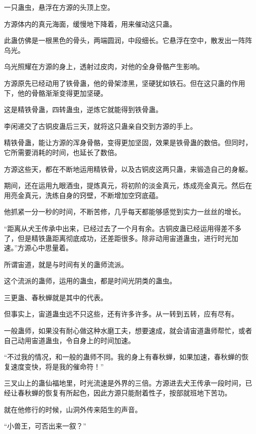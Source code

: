
\begin{this_body}

一只蛊虫，悬浮在方源的头顶上空。

方源体内的真元海面，缓慢地下降着，用来催动这只蛊。

此蛊仿佛是一根黑色的骨头，两端圆润，中段细长。它悬浮在空中，散发出一阵阵乌光。

乌光照耀在方源的身上，透射过皮肉，对他的全身骨骼产生影响。

方源原先已经动用了铁骨蛊，他的骨架漆黑，坚硬犹如铁石。但在这只蛊的作用下，他的骨骼渐渐变得更加坚硬。

这是精铁骨蛊，四转蛊虫，逆炼它就能得到铁骨蛊。

李闲递交了古铜皮蛊后三天，就将这只蛊亲自交到方源的手上。

精铁骨蛊，能让方源的浑身骨骼，变得更加坚固，效果是铁骨蛊的数倍。但同时，它所需要消耗的时间，也延长了数倍。

方源这些天，都在不断地运用精铁骨，以及古铜皮这两只蛊，来锻造自己的身躯。

期间，还在运用九眼酒虫，提炼真元，将初阶的淡金真元，炼成亮金真元。然后在用亮金真元，洗练自身的窍壁，不断增加空窍底蕴。

他抓紧一分一秒的时间，不断苦修，几乎每天都能够感觉到实力一丝丝的增长。

“距离从犬王传承中出来，已经过去了一个月有余。古铜皮蛊已经运用得差不多了，但是精铁蛊距离彻底成功，还差距很多。除非动用宙道蛊虫，进行时光加速。”方源心中思量着。

所谓宙道，就是与时间有关的蛊师流派。

这个流派的蛊师，运用的蛊虫，都是时间光阴类的蛊虫。

三更蛊、春秋蝉就是其中的代表。

但事实上，宙道蛊虫远不只这些，还有许多许多。从一转到五转，应有尽有。

一般蛊师，如果没有耐心做这种水磨工夫，想要速成，就会请宙道蛊师帮忙，或者自己动用宙道蛊虫，令自身上的时间加速。

“不过我的情况，和一般的蛊师不同。我的身上有春秋蝉，如果加速，春秋蝉的恢复速度变快，将是我的催命符！”

三叉山上的蛊仙福地里，时光流速是外界的三倍。方源进去犬王传承一段时间，已经让春秋蝉的恢复有所起色，因此方源只能耐着性子，按部就班地下苦功。

就在他修行的时候，山洞外传来陌生的声音。

“小兽王，可否出来一叙？”


\end{this_body}

